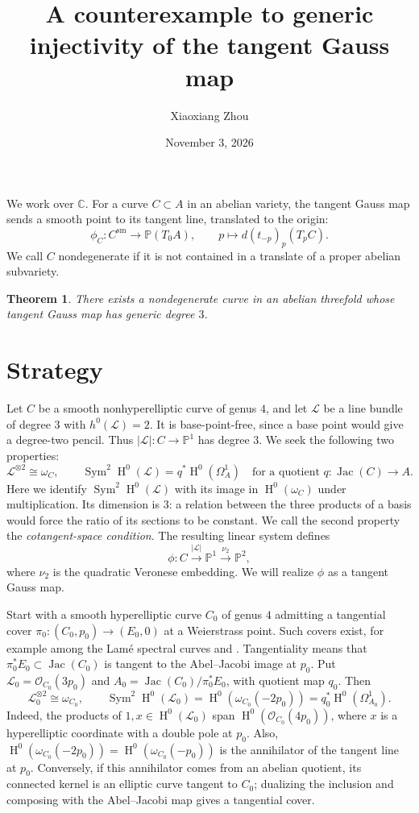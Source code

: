 \documentclass{amsart}
\title[The tangent Gauss map]{A counterexample to generic injectivity of the tangent Gauss map}
\author{Xiaoxiang Zhou}
\date{November 3, 2026}
\newtheorem{theorem}{Theorem}
\DeclareMathOperator{\Sym}{Sym}
\DeclareMathOperator{\Hnm}{H}
\DeclareMathOperator{\Jac}{Jac}
\begin{document}
\maketitle

We work over $\mathbb{C}$. For a curve $C\subset A$ in an abelian variety,
the tangent Gauss map sends a smooth point to its tangent line, translated
to the origin:
\[
\phi_C:C^{\mathrm{sm}}\longrightarrow\mathbb{P}(T_0A),\qquad
p\longmapsto d(t_{-p})_p(T_pC).
\]
We call $C$ nondegenerate if it is not contained in a translate of a
proper abelian subvariety.

\begin{theorem}\label{thm:weak}
There exists a nondegenerate curve in an abelian threefold whose tangent
Gauss map has generic degree $3$.
\end{theorem}

\section{Strategy}

Let $C$ be a smooth nonhyperelliptic curve of genus $4$, and let
$\mathcal{L}$ be a line bundle of degree $3$ with $h^0(\mathcal{L})=2$.
It is base-point-free, since a base point would give a degree-two pencil.
Thus $|\mathcal{L}|:C\longrightarrow\mathbb{P}^1$ has degree $3$.
We seek the following two properties:
\[
\mathcal{L}^{\otimes2}\cong\omega_C,\qquad
\Sym^2\Hnm^0(\mathcal{L})=q^*\Hnm^0(\Omega_A^1)
\quad\text{for a quotient }q:\Jac(C)\longrightarrow A.
\]
Here we identify $\Sym^2\Hnm^0(\mathcal{L})$ with its image in
$\Hnm^0(\omega_C)$ under multiplication. Its dimension is $3$: a relation
between the three products of a basis would force the ratio of its
sections to be constant. We call the second property the
\emph{cotangent-space condition}. The resulting linear system defines
\[
\phi:C\overset{|\mathcal{L}|}{\longrightarrow}\mathbb{P}^1
\overset{\nu_2}{\longrightarrow}\mathbb{P}^2,
\]
where $\nu_2$ is the quadratic Veronese embedding. We will realize
$\phi$ as a tangent Gauss map.

Start with a smooth hyperelliptic curve $C_0$ of genus $4$ admitting a
tangential cover $\pi_0:(C_0,p_0)\longrightarrow(E_0,0)$ at a Weierstrass
point. Such covers exist, for example among the Lam\'e spectral curves
\cite[Table~3 and Theorem~L]{maier} and \cite[Proposition~3.1]{eilbeck}.
Tangentiality means that $\pi_0^*E_0\subset\Jac(C_0)$ is tangent to the
Abel--Jacobi image at $p_0$. Put
$\mathcal{L}_0=\mathcal{O}_{C_0}(3p_0)$ and
$A_0=\Jac(C_0)/\pi_0^*E_0$, with quotient map $q_0$. Then
\[
\mathcal{L}_0^{\otimes2}\cong\omega_{C_0},\qquad
\Sym^2\Hnm^0(\mathcal{L}_0)
=\Hnm^0\left(\omega_{C_0}(-2p_0)\right)
=q_0^*\Hnm^0(\Omega_{A_0}^1).
\]
Indeed, the products of $1,x\in\Hnm^0(\mathcal{L}_0)$ span
$\Hnm^0\left(\mathcal{O}_{C_0}(4p_0)\right)$, where $x$ is a
hyperelliptic coordinate with a double pole at $p_0$. Also,
$\Hnm^0\left(\omega_{C_0}(-2p_0)\right)
=\Hnm^0\left(\omega_{C_0}(-p_0)\right)$ is the annihilator of the
tangent line at $p_0$. Conversely, if this annihilator comes from an
abelian quotient, its connected kernel is an elliptic curve tangent to
$C_0$; dualizing the inclusion and composing with the Abel--Jacobi map
gives a tangential cover.
\end{document}
